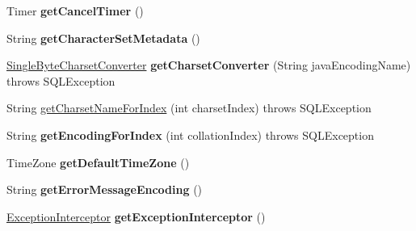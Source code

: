 \begin{DoxyCompactItemize}
Timer {\bfseries get\+Cancel\+Timer} ()
\item 
\mbox{\label{interfacecom_1_1mysql_1_1jdbc_1_1_my_s_q_l_connection_aa61964de52a43127056421877e2e09fb}} 
String {\bfseries get\+Character\+Set\+Metadata} ()
\item 
\mbox{\label{interfacecom_1_1mysql_1_1jdbc_1_1_my_s_q_l_connection_a4afce698c215b1a83b18189a8e335e5d}} 
\mbox{\hyperlink{classcom_1_1mysql_1_1jdbc_1_1_single_byte_charset_converter}{Single\+Byte\+Charset\+Converter}} {\bfseries get\+Charset\+Converter} (String java\+Encoding\+Name)  throws S\+Q\+L\+Exception
\item 
String \mbox{\hyperlink{interfacecom_1_1mysql_1_1jdbc_1_1_my_s_q_l_connection_a22f366874501fa1c71054ad89fc56b32}{get\+Charset\+Name\+For\+Index}} (int charset\+Index)  throws S\+Q\+L\+Exception
\item 
\mbox{\label{interfacecom_1_1mysql_1_1jdbc_1_1_my_s_q_l_connection_a8ea76d1f8b820bcde653dbea0a34c70b}} 
String {\bfseries get\+Encoding\+For\+Index} (int collation\+Index)  throws S\+Q\+L\+Exception
\item 
\mbox{\label{interfacecom_1_1mysql_1_1jdbc_1_1_my_s_q_l_connection_ab3ff2d845a14647c384e94a4683c28a0}} 
Time\+Zone {\bfseries get\+Default\+Time\+Zone} ()
\item 
\mbox{\label{interfacecom_1_1mysql_1_1jdbc_1_1_my_s_q_l_connection_a57ac2fb7b5c498e78600a609bdcc4831}} 
String {\bfseries get\+Error\+Message\+Encoding} ()
\item 
\mbox{\label{interfacecom_1_1mysql_1_1jdbc_1_1_my_s_q_l_connection_a9882ee8fc9f2d874aaca99d62d95ed69}} 
\mbox{\hyperlink{interfacecom_1_1mysql_1_1jdbc_1_1_exception_interceptor}{Exception\+Interceptor}} {\bfseries get\+Exception\+Interceptor} ()
\item 
\mbox{\label{interfacecom_1_1mysql_1_1jdbc_1_1_my_s_q_l_connection_a3e4dcf3af4a856b68e9fb2958b49d301}} 

\end{DoxyCompactItemize}
